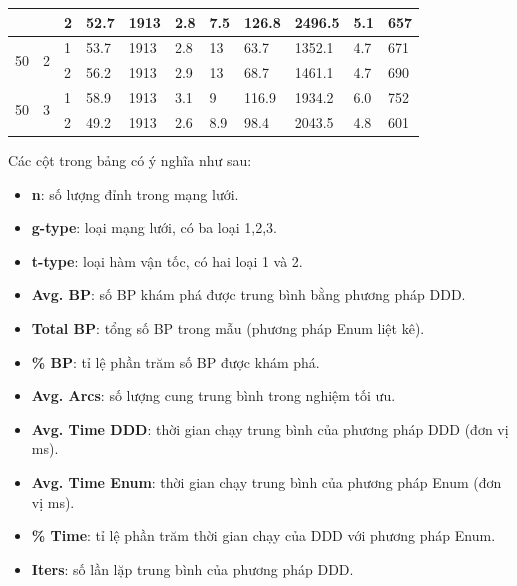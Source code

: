 \documentclass[../main.tex]{subfiles}
\begin{document}
\begin{table}[H]
{\begin{tabular}{|p{0.5cm}|p{1cm}|p{1cm}||p{1.5cm}|p{1.5cm}|p{1.3cm}||p{1.5cm}|p{2.5cm}|p{2.5cm}|p{1.3cm}|p{1.3cm}|}
                    &                    & 2     & 52.7            & 1913     & 2.8             & 7.5               & 126.8                 & 2496.5                 & 5.1          & 657        \\ \midrule
\multirow{2}{*}{50} & \multirow{2}{*}{2} & 1     & 53.7            & 1913     & 2.8             & 13                & 63.7                  & 1352.1                 & 4.7          & 671        \\
                    &                    & 2     & 56.2            & 1913     & 2.9             & 13                & 68.7                  & 1461.1                 & 4.7          & 690        \\ \midrule
\multirow{2}{*}{50} & \multirow{2}{*}{3} & 1     & 58.9            & 1913     & 3.1             & 9                 & 116.9                 & 1934.2                 & 6.0          & 752        \\
                    &                    & 2     & 49.2            & 1913     & 2.6             & 8.9               & 98.4                  & 2043.5                 & 4.8          & 601         \\ \bottomrule
  \end{tabular}
  }
\end{table}

Các cột trong bảng có ý nghĩa như sau: 
\begin{itemize}
  \item \textbf{n}: số lượng đỉnh trong mạng lưới.
  \item \textbf{g-type}: loại mạng lưới, có ba loại 1,2,3.
  \item \textbf{t-type}: loại hàm vận tốc, có hai loại 1 và 2.
  \item \textbf{Avg. BP}: số BP khám phá được trung bình bằng phương pháp DDD.
  \item \textbf{Total BP}: tổng số BP trong mẫu (phương pháp Enum liệt kê).
  \item \textbf{\% BP}: tỉ lệ phần trăm số BP được khám phá.
  \item \textbf{Avg. Arcs}: số lượng cung trung bình trong nghiệm tối ưu.
  \item \textbf{Avg. Time DDD}: thời gian chạy trung bình của phương pháp DDD (đơn vị ms).
  \item \textbf{Avg. Time Enum}: thời gian chạy trung bình của phương pháp Enum (đơn vị ms).
  \item \textbf{\% Time}: tỉ lệ phần trăm thời gian chạy của DDD với phương pháp Enum.
  \item \textbf{Iters}: số lần lặp trung bình của phương pháp DDD.
\end{itemize}
\end{document}
